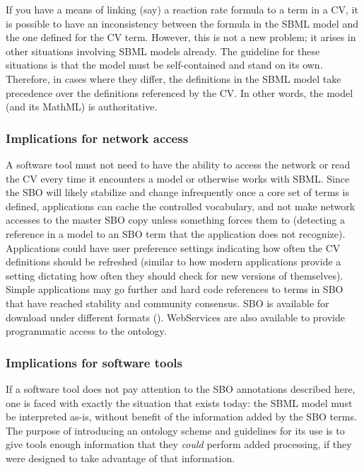 If you have a means of linking (say) a reaction rate formula to a
term in a CV, it is possible to have an inconsistency between the
formula in the SBML model and the one defined for the CV term.
However, this is not a new problem; it arises in other situations
involving SBML models already.  The guideline for these situations
is that the model must be self-contained and stand on its own.
Therefore, in cases where they differ, the definitions in the SBML
model take precedence over the definitions referenced by the CV.
In other words, the model (and its MathML) is authoritative.

\subsubsection{Implications for network access}
\label{sec:sbo-implications-for-network-access}

A software tool must not need to have the ability to access the network or
read the CV every time it encounters a model or otherwise works
with SBML.  Since the SBO will likely stabilize and change
infrequently once a core set of terms is defined, applications can
cache the controlled vocabulary, and not make network accesses to
the master SBO copy unless something forces them to (\eg detecting
a reference in a model to an SBO term that the application does
not recognize).  Applications could have user
preference settings indicating how often the CV definitions should
be refreshed (similar to how modern applications provide a setting
dictating how often they should check for new versions of
themselves).  Simple applications may go further and hard code
references to terms in SBO that have reached stability and
community consensus. SBO is available for download under different formats (\sboref). WebServices are also available to provide programmatic access to the ontology.

\subsubsection{Implications for software tools}

If a software tool does not pay attention to the SBO
annotations described here, one is faced with exactly the
situation that exists today: the SBML model must be interpreted
as-is, without benefit of the information added by the SBO terms.
The purpose of introducing an ontology scheme and guidelines for
its use is to give tools enough information that they \emph{could}
perform added processing, if they were designed to take advantage
of that information.
% 
% 
% 
